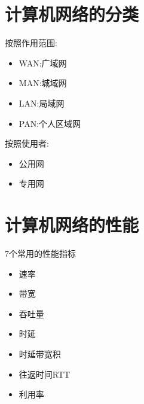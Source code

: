 \documentclass{ctexart}
\begin{document}
\section{计算机网络的分类}
按照作用范围:
\begin{itemize}
    \item WAN:广域网
    \item MAN:城域网
    \item LAN:局域网
    \item PAN:个人区域网
\end{itemize}
按照使用者:

\begin{itemize}
    \item 公用网
    \item 专用网
\end{itemize}

\section{计算机网络的性能}
7个常用的性能指标
\begin{itemize}
    \item 速率
    \item 带宽
    \item 吞吐量
    \item 时延
    \item 时延带宽积
    \item 往返时间RTT
    \item 利用率
\end{itemize}
\end{document}
